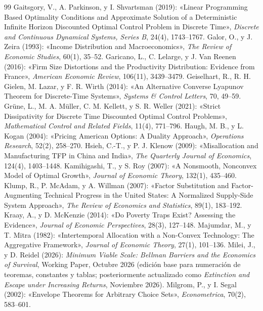 \documentclass[11pt,letterpaper]{article}
\theoremstyle{plain}
\begin{document}
\begin{thebibliography}{99}
 Gaitsgory, V., A. Parkinson, y I. Shvartsman (2019): «Linear Programming Based Optimality Conditions and Approximate Solution of a Deterministic Infinite Horizon Discounted Optimal Control Problem in Discrete Time», \emph{Discrete and Continuous Dynamical Systems, Series B}, 24(4), 1743--1767.
 Galor, O., y J. Zeira (1993): «Income Distribution and Macroeconomics», \emph{The Review of Economic Studies}, 60(1), 35--52.
 Garicano, L., C. Lelarge, y J. Van Reenen (2016): «Firm Size Distortions and the Productivity Distribution: Evidence from France», \emph{American Economic Review}, 106(11), 3439--3479.
 Geiselhart, R., R. H. Gielen, M. Lazar, y F. R. Wirth (2014): «An Alternative Converse Lyapunov Theorem for Discrete-Time Systems», \emph{Systems \& Control Letters}, 70, 49--59.
 Grüne, L., M. A. Müller, C. M. Kellett, y S. R. Weller (2021): «Strict Dissipativity for Discrete Time Discounted Optimal Control Problems», \emph{Mathematical Control and Related Fields}, 11(4), 771--796.
 Haugh, M. B., y L. Kogan (2004): «Pricing American Options: A Duality Approach», \emph{Operations Research}, 52(2), 258--270.
 Hsieh, C.-T., y P. J. Klenow (2009): «Misallocation and Manufacturing TFP in China and India», \emph{The Quarterly Journal of Economics}, 124(4), 1403--1448.
 Kamihigashi, T., y S. Roy (2007): «A Nonsmooth, Nonconvex Model of Optimal Growth», \emph{Journal of Economic Theory}, 132(1), 435--460.
 Klump, R., P. McAdam, y A. Willman (2007): «Factor Substitution and Factor-Augmenting Technical Progress in the United States: A Normalized Supply-Side System Approach», \emph{The Review of Economics and Statistics}, 89(1), 183--192.
 Kraay, A., y D. McKenzie (2014): «Do Poverty Traps Exist? Assessing the Evidence», \emph{Journal of Economic Perspectives}, 28(3), 127--148.
 Majumdar, M., y T. Mitra (1982): «Intertemporal Allocation with a Non-Convex Technology: The Aggregative Framework», \emph{Journal of Economic Theory}, 27(1), 101--136.
 Milei, J., y D. Reidel (2026): \emph{Minimum Viable Scale: Bellman Barriers and the Economics of Survival}, Working Paper, Octubre 2026 (edición base para numeración de teoremas, constantes y tablas; posteriormente actualizado como \emph{Extinction and Escape under Increasing Returns}, Noviembre 2026).
 Milgrom, P., y I. Segal (2002): «Envelope Theorems for Arbitrary Choice Sets», \emph{Econometrica}, 70(2), 583--601.

\end{thebibliography}
\end{document}
